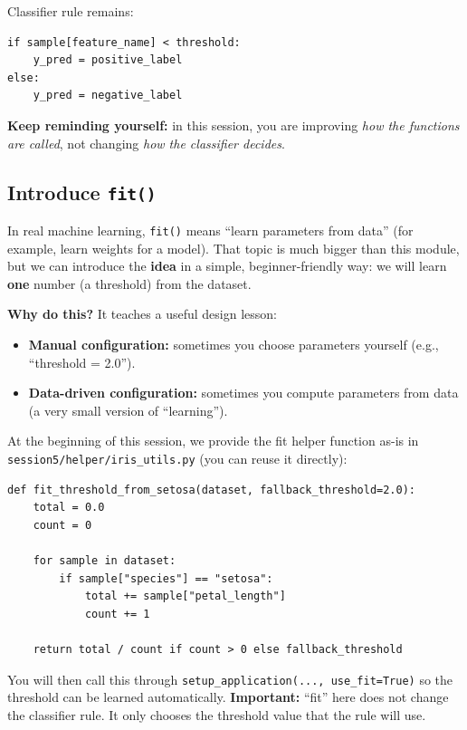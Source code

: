 

Classifier rule remains:
\begin{verbatim}
if sample[feature_name] < threshold:
    y_pred = positive_label
else:
    y_pred = negative_label
\end{verbatim}
\noindent
\textbf{Keep reminding yourself:} in this session, you are improving \textit{how the functions are called}, not changing \textit{how the classifier decides}.

\subsection{Introduce \texttt{fit()}}
In real machine learning, \texttt{fit()} means ``learn parameters from data'' (for example, learn weights for a model).
That topic is much bigger than this module, but we can introduce the \textbf{idea} in a simple, beginner-friendly way:
we will learn \textbf{one} number (a threshold) from the dataset.

\noindent
\textbf{Why do this?} It teaches a useful design lesson:
\begin{itemize}\setlength{\itemsep}{2pt}
    \item \textbf{Manual configuration:} sometimes you choose parameters yourself (e.g., ``threshold = 2.0'').
    \item \textbf{Data-driven configuration:} sometimes you compute parameters from data (a very small version of ``learning'').
\end{itemize}

At the beginning of this session, we provide the fit helper function as-is in \texttt{session5/helper/iris\_utils.py} (you can reuse it directly):
\begin{verbatim}
def fit_threshold_from_setosa(dataset, fallback_threshold=2.0):
    total = 0.0
    count = 0

    for sample in dataset:
        if sample["species"] == "setosa":
            total += sample["petal_length"]
            count += 1

    return total / count if count > 0 else fallback_threshold
\end{verbatim}

You will then call this through \texttt{setup\_application(..., use\_fit=True)} so the threshold can be learned automatically.
\noindent
\textbf{Important:} ``fit'' here does not change the classifier rule. It only chooses the threshold value that the rule will use.


